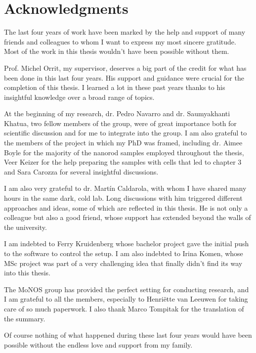 \chapter*{Acknowledgments}


The last four years of work have been marked by the help and support of many
friends and colleagues to whom I want to express my most sincere gratitude.
Most of the work in this thesis wouldn't have been possible without them. 

Prof. Michel Orrit, my supervisor, deserves a big part of the credit for what
has been done in this last four years. His support and guidance were crucial
for the completion of this thesis. I learned a lot in these past years thanks to
his insightful knowledge over a broad range of topics. 

At the beginning of my research, dr. Pedro Navarro and dr. Saumyakhanti
Khatua, two fellow members of the group, were of great importance both for
scientific discussion and for me to integrate into the group. I am also
grateful to the members of the project in which my PhD was framed, including dr.
Aimee Boyle for the majority of the nanorod samples employed throughout the
thesis, Veer Keizer for the help preparing the samples with cells that led
to chapter 3 and Sara Carozza for several insightful discussions. 

I am also very grateful to dr. Mart\'{i}n Caldarola, with whom I have shared
many hours in the same dark, cold lab. Long discussions with him triggered different
approaches and ideas, some of which are reflected in this thesis. He is not only
a colleague but also a good friend, whose support has extended beyond the walls
of the university.

I am indebted to Ferry Kruidenberg whose bachelor project gave the initial
push to the software to control the setup. I am also indebted to Irina Komen,
whose MSc project was part of a very challenging idea that finally didn't find
its way into this thesis. 

The MoNOS group has provided the perfect setting for conducting research, and I
am grateful to all the members, especially to Henri\"{e}tte van Leeuwen for
taking care of so much paperwork. I also thank Marco Tompitak for the
translation of the summary.

Of course nothing of what happened during these last four years would have
been possible without the endless love and support from my family.